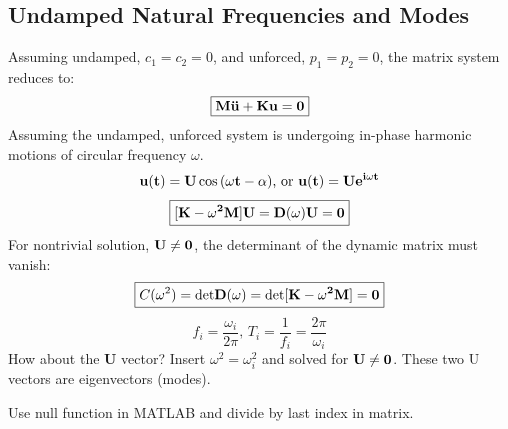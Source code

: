 \documentclass{article}
\begin{document}
\begin{multicols*}{2}
    \subsection*{Undamped Natural Frequencies and Modes}
    Assuming undamped, $c_1=c_2=0$, and unforced, $p_1=p_2=0$, the matrix system reduces to:
    $$\boxed{\bf{M\ddot{u}+Ku=0}}$$
    Assuming the undamped, unforced system is undergoing in-phase harmonic motions of circular frequency $\omega$. 
    $$\bf{u}(t)=\bf{U}\cos{(\omega t-\alpha)} \text{, or } \bf{u}(t)=\bf{U}e^{i\omega t}$$
    $$\boxed{[\bf{K}-\omega^2\bf{M}]\bf{U}=\bf{D}(\omega)\bf{U}=\bf{0}}$$
    For nontrivial solution, $\bf{U}\neq 0$, the determinant of the dynamic matrix must vanish:
    $$\boxed{C(\omega^2)=\mbox{det}\bf{D}(\omega)=\mbox{det}[\bf{K}-\omega^2\bf{M}]=0}$$
    $$f_i=\frac{\omega_i}{2\pi} \text{, } T_i=\frac{1}{f_i}=\frac{2\pi}{\omega_i}$$
    How about the \textbf{U} vector? Insert $\omega^2=\omega_i^2$ and solved for $\bf{U}\neq0$. These two U vectors are eigenvectors (modes).

    Use null function in MATLAB and divide by last index in matrix.
    


\end{multicols*}  
\end{document}
